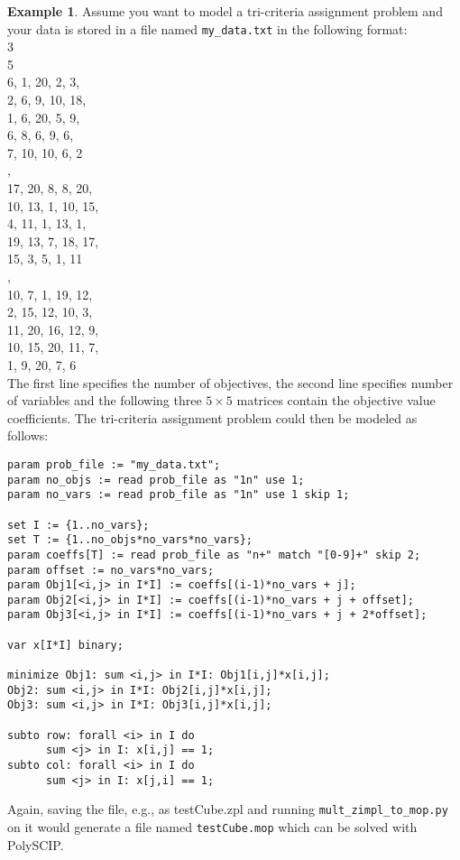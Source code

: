 \documentclass[11pt,listof=totoc]{scrartcl}
\theoremstyle{definition}
\newtheorem{ex}{Example}[section]
\begin{document}
\begin{ex}Assume you want to model a tri-criteria assignment problem
  and your data is stored in a file named
  \texttt{my\_data.txt} in the following format: \\
  3\\
  5\\
  6, 1, 20, 2, 3,\\
  2, 6, 9, 10, 18,\\
  1, 6, 20, 5, 9,\\
  6, 8, 6, 9, 6,\\
  7, 10, 10, 6, 2\\
  ,\\
  17, 20, 8, 8, 20,\\
  10, 13, 1, 10, 15,\\
  4, 11, 1, 13, 1,\\
  19, 13, 7, 18, 17,\\
  15, 3, 5, 1, 11\\
  ,\\
  10, 7, 1, 19, 12,\\
  2, 15, 12, 10, 3,\\
  11, 20, 16, 12, 9,\\
  10, 15, 20, 11, 7,\\
  1, 9, 20, 7, 6\\

  The first line specifies the number of objectives, the second line
  specifies number of variables and the following three $5 \times 5$
  matrices contain the objective value coefficients. The
  tri-criteria assignment problem could then be modeled as follows:
\begin{verbatim}
param prob_file := "my_data.txt";
param no_objs := read prob_file as "1n" use 1;
param no_vars := read prob_file as "1n" use 1 skip 1;

set I := {1..no_vars};
set T := {1..no_objs*no_vars*no_vars};
param coeffs[T] := read prob_file as "n+" match "[0-9]+" skip 2;
param offset := no_vars*no_vars;
param Obj1[<i,j> in I*I] := coeffs[(i-1)*no_vars + j];
param Obj2[<i,j> in I*I] := coeffs[(i-1)*no_vars + j + offset];
param Obj3[<i,j> in I*I] := coeffs[(i-1)*no_vars + j + 2*offset];

var x[I*I] binary;

minimize Obj1: sum <i,j> in I*I: Obj1[i,j]*x[i,j];
Obj2: sum <i,j> in I*I: Obj2[i,j]*x[i,j];
Obj3: sum <i,j> in I*I: Obj3[i,j]*x[i,j];

subto row: forall <i> in I do
      sum <j> in I: x[i,j] == 1;
subto col: forall <i> in I do
      sum <j> in I: x[j,i] == 1;
\end{verbatim}

Again, saving the file, e.g., as testCube.zpl and running \texttt{mult\_zimpl\_to\_mop.py} on it would generate a file named \texttt{testCube.mop} which can be solved with PolySCIP.
\end{ex}
\end{document}
